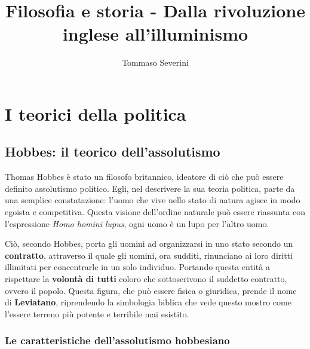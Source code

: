 \documentclass[10pt,a4paper]{article}
\author{Tommaso Severini}
\title{Filosofia e storia - Dalla rivoluzione inglese all'illuminismo}
\begin{document}
	\maketitle
	
	\section*{I teorici della politica}
	
	\subsection*{Hobbes: il teorico dell'assolutismo}
	
	Thomas Hobbes è stato un filosofo britannico, ideatore di ciò che può essere definito assolutismo politico. Egli, nel descrivere la sua teoria politica, parte da una semplice constatazione: l'uomo che vive nello stato di natura agisce in modo egoista e competitiva. Questa visione dell'ordine naturale può essere riassunta con l'espressione \textit{Homo homini lupus}, ogni uomo è un lupo per l'altro uomo.
	
	Ciò, secondo Hobbes, porta gli uomini ad organizzarsi in uno stato secondo un \textbf{contratto}, attraverso il quale gli uomini, ora sudditi, rinunciano ai loro diritti illimitati per concentrarle in un solo individuo. Portando questa entità a rispettare la \textbf{volontà di tutti} coloro che sottoscrivono il suddetto contratto, ovvero il popolo. Questa figura, che può essere fisica o giuridica, prende il nome di \textbf{Leviatano}, riprendendo la simbologia biblica che vede questo mostro come l'essere terreno più potente e terribile mai esistito. 
	
	\subsubsection*{Le caratteristiche dell'assolutismo hobbesiano}
	
\end{document}

